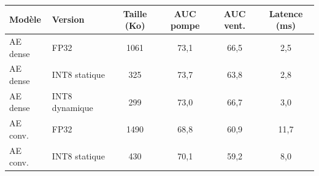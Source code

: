 \begin{tabular}{llcccc}
\toprule
Modèle & Version & Taille (Ko) & AUC pompe & AUC vent. & Latence (ms) \\
\midrule
AE dense & FP32 & 1061 & 73,1 & 66,5 & 2,5 \\
AE dense & INT8 statique & 325 & 73,7 & 63,8 & 2,8 \\
AE dense & INT8 dynamique & 299 & 73,0 & 66,7 & 3,0 \\
AE conv. & FP32 & 1490 & 68,8 & 60,9 & 11,7 \\
AE conv. & INT8 statique & 430 & 70,1 & 59,2 & 8,0 \\
\bottomrule
\end{tabular}